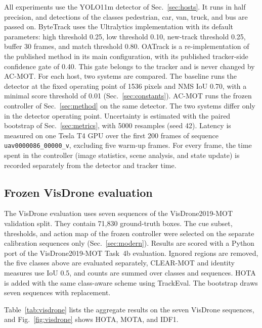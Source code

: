 \documentclass[journal]{new-aiaa}
\begin{document}
All experiments use the YOLO11m detector of Sec.~\ref{sec:hosts}. It runs in
half precision, and detections of the classes pedestrian, car, van, truck, and
bus are passed on. ByteTrack uses the Ultralytics implementation with its
default parameters: high threshold 0.25, low threshold 0.10, new-track
threshold 0.25, buffer 30 frames, and match threshold 0.80. OATrack is a
re-implementation of the published method \cite{qi2026oatrack} in its main
configuration, with its published tracker-side confidence gate of 0.40. This
gate belongs to the tracker and is never changed by AC-MOT. For each host, two
systems are compared. The baseline runs the detector at the fixed operating
point of 1536 pixels and NMS IoU 0.70, with a minimal score threshold of 0.01
(Sec.~\ref{sec:constants}). AC-MOT runs the frozen controller of
Sec.~\ref{sec:method} on the same detector. The two systems differ only in
the detector operating point. Uncertainty is estimated with the paired
bootstrap of Sec.~\ref{sec:metrics}, with 5000 resamples (seed 42).
Latency is measured on one Tesla T4 GPU over the first 200 frames of sequence
\texttt{uav0000086\_00000\_v}, excluding five warm-up frames. For every
frame, the time spent in the controller (image statistics, scene analysis, and
state update) is recorded separately from the detector and tracker time.

\subsection{Frozen VisDrone evaluation}
The VisDrone evaluation uses seven sequences of the VisDrone2019-MOT
validation split. They contain 71,830 ground-truth boxes. The cue subset,
thresholds, and action map of the frozen controller were selected on the
separate calibration sequences only (Sec.~\ref{sec:modern}). Results are
scored with a Python port of the VisDrone2019-MOT Task~4b evaluation. Ignored
regions are removed, the five classes above are evaluated separately,
CLEAR-MOT and identity measures use IoU 0.5, and counts are summed over
classes and sequences. HOTA is added with the same class-aware scheme using
TrackEval. The bootstrap draws seven sequences with replacement.

Table~\ref{tab:visdrone} lists the aggregate results on the seven VisDrone
sequences, and Fig.~\ref{fig:visdrone} shows HOTA, MOTA, and IDF1.
\end{document}
